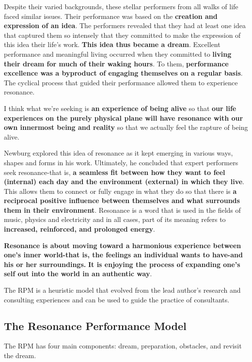 \documentclass[ebook,12pt,oneside,openany]{memoir}
\begin{document}
Despite their varied backgrounds, these stellar performers from all walks of life faced similar issues. 
Their performance was based on the \textbf{creation and expression of an idea}.
The performers revealed that they had at least one idea that captured them so intensely that they committed to make the expression of this idea
their life's work.
\textbf{This idea thus became a dream}. Excellent performance and meaningful living occurred when they committed to \textbf{living their dream for much of their waking hours}.
To them, \textbf{performance excellence was a byproduct of engaging themselves on a regular basis}.
The cyclical process that guided their performance allowed them to experience resonance.

\begin{displayquote}
    I think what we're seeking is \textbf{an experience of being alive} so that \textbf{our life experiences on the purely physical plane
    will have resonance with our own innermost being and reality} so that we actually feel the rapture of being alive.
\end{displayquote}   

Newburg explored this idea of resonance as it kept emerging in various ways, shapes and forms in his work. 
Ultimately, he concluded that expert performers seek resonance-that is, \textbf{a seamless fit between how they want to feel (internal) each day and the environment (external) in which they live}.
This allows them to connect or fully engage in what they do so that there is \textbf{a reciprocal positive influence between themselves and what surrounds them in their environment}.
Resonance is a word that is used in the fields of music, physics and electricity and in all cases, part of its meaning refers to \textbf{increased, reinforced, and prolonged energy}.

\textbf{Resonance is about moving toward a harmonious experience between one's inner world-that is, the feelings an individual wants to have-and his or her surroundings.}
\textbf{It is enjoying the process of expanding one's self out into the world in an authentic way}.

The RPM is a heuristic model that evolved from the lead author's research and consulting experiences and can be used to guide the practice of consultants.

\subsection{The Resonance Performance Model}
The RPM has four main components: dream, preparation, obstacles, and revisit the dream.
\end{document}
